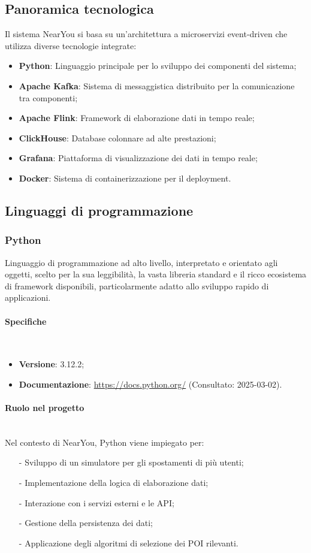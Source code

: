 \documentclass[10pt]{article}
\newcommand{\myparagraph}[1]{\paragraph{#1}\mbox{}\\}
\begin{document}
\subsection{Panoramica tecnologica}
Il sistema NearYou si basa su un'architettura a microservizi event-driven che utilizza diverse tecnologie integrate:

\begin{itemize}
    \item \textbf{Python}: Linguaggio principale per lo sviluppo dei componenti del sistema;
    \item \textbf{Apache Kafka}: Sistema di messaggistica distribuito per la comunicazione tra componenti;
    \item \textbf{Apache Flink}: Framework di elaborazione dati in tempo reale;
    \item \textbf{ClickHouse}: Database colonnare ad alte prestazioni;
    \item \textbf{Grafana}: Piattaforma di visualizzazione dei dati in tempo reale;
    \item \textbf{Docker}: Sistema di containerizzazione per il deployment.
\end{itemize}

\subsection{Linguaggi di programmazione}
\label{sec:linguaggi}

\subsubsection{Python}
Linguaggio di programmazione ad alto livello, interpretato e orientato agli oggetti, scelto per la sua leggibilità, la vasta libreria standard e il ricco ecosistema di framework disponibili, particolarmente adatto allo sviluppo rapido di applicazioni.

\myparagraph{Specifiche}
\begin{itemize}
    \item \textbf{Versione}: 3.12.2;
    \item \textbf{Documentazione}: \textcolor{blue}{\url{https://docs.python.org/}} (Consultato: 2025-03-02).
\end{itemize}

\myparagraph{Ruolo nel progetto}
Nel contesto di NearYou, Python viene impiegato per:
\begin{itemize}
    \item[-] Sviluppo di un simulatore per gli spostamenti di più utenti;
    \item[-] Implementazione della logica di elaborazione dati;
    \item[-] Interazione con i servizi esterni e le API;
    \item[-] Gestione della persistenza dei dati;
    \item[-] Applicazione degli algoritmi di selezione dei POI rilevanti.
\end{itemize}
\end{document}
